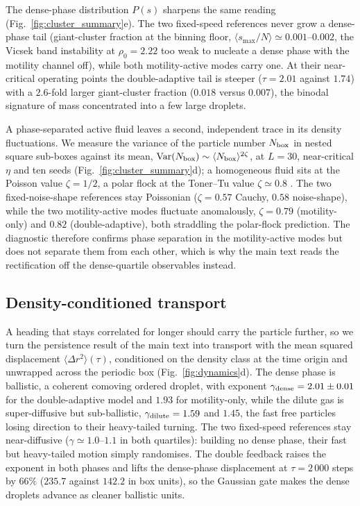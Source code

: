 \documentclass[11pt,a4paper]{article}
\begin{document}
The dense-phase distribution $P(s)$ sharpens the same reading
(Fig.~\ref{fig:cluster_summary}e). The two fixed-speed references
never grow a dense-phase tail (giant-cluster fraction at the
binning floor, $\langle s_{\max}/N\rangle \simeq 0.001$--$0.002$,
the Vicsek band instability at $\rho_0 = 2.22$ too weak to
nucleate a dense phase with the motility channel off), while both
motility-active modes carry one. At their near-critical operating
points the double-adaptive tail is steeper ($\tau = 2.01$ against
$1.74$) with a $2.6$-fold larger giant-cluster fraction ($0.018$
versus $0.007$), the binodal signature of mass concentrated into a
few large droplets.

A phase-separated active fluid leaves a second, independent trace
in its density fluctuations. We measure the variance of the
particle number $N_{\rm box}$ in nested square sub-boxes against
its mean,
$\mathrm{Var}(N_{\rm box}) \sim \langle N_{\rm box}\rangle^{2\zeta}$,
at $L = 30$, near-critical $\eta$ and ten seeds
(Fig.~\ref{fig:cluster_summary}d); a homogeneous fluid sits at the
Poisson value $\zeta = 1/2$, a polar flock at the Toner--Tu
value $\zeta \simeq 0.8$ \citep{TonerTu1995}. The two
fixed-noise-shape references stay Poissonian ($\zeta = 0.57$
Cauchy, $0.58$ noise-shape), while the two motility-active modes
fluctuate anomalously, $\zeta = 0.79$ (motility-only) and $0.82$
(double-adaptive), both straddling the polar-flock prediction. The
diagnostic therefore confirms phase separation in the
motility-active modes but does not separate them from each other,
which is why the main text reads the rectification off the
dense-quartile observables instead.

\subsection*{Density-conditioned transport}
\label{sec:supp-msd}

A heading that stays correlated for longer should carry the
particle further, so we turn the persistence result of the main
text into transport with the mean squared displacement
$\langle\Delta r^2\rangle(\tau)$, conditioned on the density class
at the time origin and unwrapped across the periodic box
(Fig.~\ref{fig:dynamics}d). The dense phase is ballistic, a
coherent comoving ordered droplet, with exponent
$\gamma_{\rm dense} = 2.01 \pm 0.01$ for the double-adaptive model
and $1.93$ for motility-only, while the dilute gas is
super-diffusive but sub-ballistic, $\gamma_{\rm dilute} = 1.59$
and $1.45$, the fast free particles losing direction to their
heavy-tailed turning. The two fixed-speed references stay
near-diffusive ($\gamma \simeq 1.0$--$1.1$ in both quartiles):
building no dense phase, their fast but heavy-tailed motion simply
randomises. The double feedback raises the exponent in both phases
and lifts the dense-phase displacement at $\tau = 2\,000$ steps by
$66\%$ ($235.7$ against $142.2$ in box units), so the Gaussian
gate makes the dense droplets advance as cleaner ballistic units.



\end{document}
